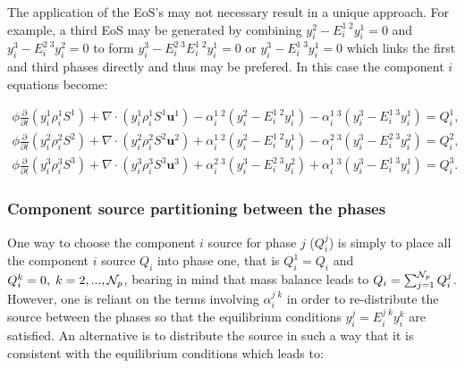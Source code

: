 The application of the EoS's may not necessary result in a unique
approach. For example, a third EoS may be generated by
combining $y_i^2 - E_i^{1\;2} y_i^1=0$ and
$y_i^3 - E_i^{2\;3} y_i^2= 0$ to form $y_i^3 - E_i^{2\;3} E_i^{1\;2} y_i^1= 0$
or $y_i^3 - E_i^{1\;3}y_i^1= 0$ which links the first and third phases
directly and thus may be prefered. In this case the component $i$ equations become:

\begin{eqnarray}
\phi  \displaystyle\frac{\partial}{\partial t}\left(y_{i}^{1}\rho_i^{1}S^{1} \right) +
\nabla\cdot\left(y_{i}^{1}\rho_i^{1}S^{1}\mathbf{u}^{1}  \right) - \alpha_i^{1\;2} (y_i^2 - E_i^{1\;2} y_i^1)
- \alpha_i^{1\;3} (y_i^3 - E_i^{1\;3} y_i^1) = Q_i^1 ,
\label{phase1-comp-i'}
\end{eqnarray}
\begin{eqnarray}
\phi \displaystyle\frac{\partial}{\partial t}\left(y_{i}^{2}\rho_i^{2}S^{2}  \right) +
 \nabla\cdot\left( y_{i}^{2}\rho_i^{2}S^{2}\mathbf{u}^{2}  \right) + \alpha_i^{1\;2} (y_i^2 - E_i^{1\;2} y_i^1)   - \alpha_i^{2\;3} (y_i^3 - E_i^{2\;3} y_i^2) = Q_i^2 ,
\label{phase2-comp-i'}
\end{eqnarray}
\begin{eqnarray}
\phi \displaystyle\frac{\partial}{\partial t}\left(y_{i}^{3}\rho_i^{3}S^{3}  \right) +
 \nabla\cdot\left( y_{i}^{3}\rho_i^{3}S^{3}\mathbf{u}^{3}  \right) +  \alpha_i^{2\;3} (y_i^3 - E_i^{2\;3} y_i^2)
 + \alpha_i^{1\;3} (y_i^3 - E_i^{1\;3} y_i^1)= Q_i^3  .
\label{phase3-comp-i'}
\end{eqnarray}



\subsubsection{Component source partitioning between the phases}
\label{Component phase source partitioning}
One way to choose
the component $i$ source for phase $j$ ($Q_i^j$) is simply
to place all the component $i$ source $Q_i$ into phase one,
that is $Q_i^1=Q_i$ and  $Q_i^k=0, \; k=2,...,{\cal N}_p$,
bearing in mind that mass balance
leads to  $Q_i=\sum_{j=1}^{{\cal N}_p} Q_i^j$.
However, one is reliant on the terms involving
$\alpha_i^{j\;k}$ in order to re-distribute the
source between the phases so that the equilibrium conditions
$y_i^j=E_i^{j\;k} y_i^k$ are satisfied.
An alternative is to distribute the source in such a way that
it is consistent with the equilibrium conditions which leads to:

